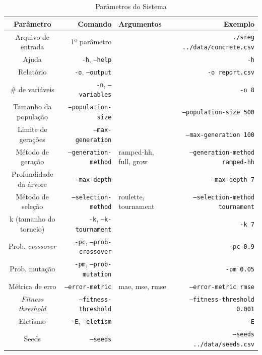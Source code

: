 \documentclass[a4paper]{article}
\begin{document}
\noindent\begin{table}[h]
  \center
  \caption{Parâmetros do Sistema}
  \label{tbl:parameters}
  \begin{tabular}{|c|r|p{1.8cm}|r|}
    \hline
    Parâmetro & Comando & Argumentos & Exemplo \\ \hline
    Arquivo de entrada & 1º parâmetro & & \texttt{./sreg ../data/concrete.csv}\\ \hline
    Ajuda & \texttt{-h}, \texttt{--help} & & \texttt{-h} \\ \hline
    Relatório & \texttt{-o}, \texttt{--output} & & \texttt{-o report.csv} \\ \hline
    \# de variáveis & \texttt{-n}, \texttt{--variables} & & \texttt{-n 8} \\ \hline
    Tamanho da população & \texttt{--population-size} & & \texttt{--population-size 500} \\ \hline
    Limite de gerações & \texttt{--max-generation} & & \texttt{--max-generation 100} \\ \hline
    Método de geração & \texttt{--generation-method} & ramped-hh, full, grow & \texttt{--generation-method ramped-hh} \\ \hline
    Profundidade da árvore & \texttt{--max-depth} & & \texttt{--max-depth 7} \\ \hline
    Método de seleção & \texttt{--selection-method} & roulette, tournament & \texttt{--selection-method tournament} \\ \hline
    k (tamanho do torneio) & \texttt{-k}, \texttt{--k-tournament} & & \texttt{-k 7} \\ \hline
    Prob. \textit{crossover} & \texttt{-pc}, \texttt{--prob-crossover} & & \texttt{-pc 0.9} \\ \hline
    Prob. mutação & \texttt{-pm}, \texttt{--prob-mutation} & & \texttt{-pm 0.05} \\ \hline
    Métrica de erro & \texttt{--error-metric} & mae, mse, rmse & \texttt{--error-metric rmse} \\ \hline
    \textit{Fitness threshold} & \texttt{--fitness-threshold} & & \texttt{--fitness-threshold 0.001} \\ \hline
    Eletismo  & \texttt{-E}, \texttt{--eletism} & & \texttt{-E} \\ \hline
    Seeds & \texttt{--seeds} & & \texttt{--seeds ../data/seeds.csv} \\ \hline
  \end{tabular}
\end{table}
\end{document}
